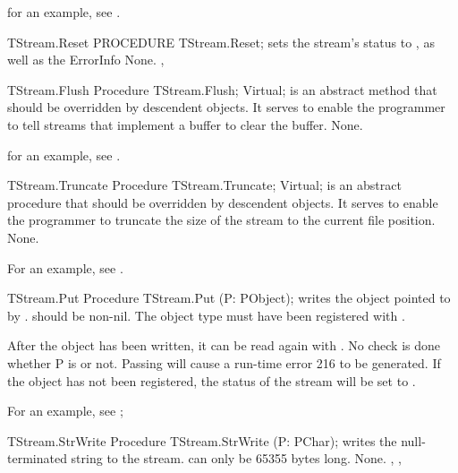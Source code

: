 for an example, see .

\begin{procedure}{TStream.Reset}
\Declaration
PROCEDURE TStream.Reset;
\Description
{} sets the stream's status to , as well as the ErrorInfo
\Errors
None.
\SeeAlso
{}, 
\end{procedure}

\begin{procedure}{TStream.Flush}
\Declaration 
Procedure TStream.Flush; Virtual;
\Description
{} is an abstract method that should be overridden by descendent
objects. It serves to enable the programmer to tell streams that implement 
a buffer to clear the buffer.
\Errors
None.
\SeeAlso
{}
\end{procedure}

for an example, see .

\begin{procedure}{TStream.Truncate}
\Declaration
Procedure TStream.Truncate; Virtual;
\Description
{} is an abstract procedure that should be overridden by
descendent objects. It serves to enable the programmer to truncate the
size of the stream to the current file position.
\Errors
None.
\SeeAlso
{}
\end{procedure}

For an example, see .

\begin{procedure}{TStream.Put}
\Declaration
Procedure TStream.Put (P: PObject);
\Description
{} writes the object pointed to by .  should be
non-nil. The object type must have been registered with .

After the object has been written, it can be read again with .
\Errors
No check is done whether P is  or not. Passing  will cause
a run-time error 216 to be generated. If the object has not been registered,
the status of the stream will be set to .
\SeeAlso
{}
\end{procedure}

For an example, see ;

\begin{procedure}{TStream.StrWrite}
\Declaration
Procedure TStream.StrWrite (P: PChar);
\Description
{} writes the null-terminated string  to the stream.
 can only be 65355 bytes long.
\Errors
None.
\SeeAlso
{}, ,
\end{procedure}

